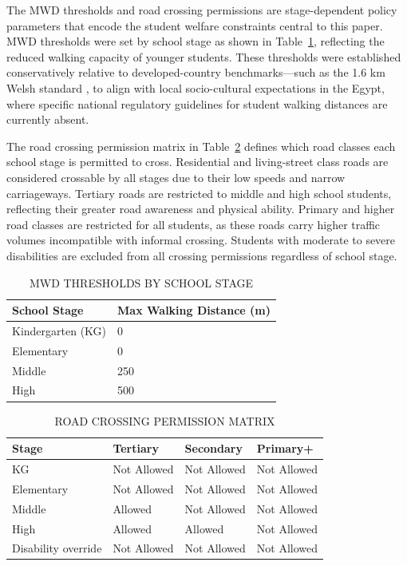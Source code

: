 \documentclass[journal]{IEEEtran}
\begin{document}
The MWD thresholds and road crossing permissions are 
stage-dependent policy parameters that encode the student welfare 
constraints central to this paper. MWD thresholds were set by 
school stage as shown in Table~\ref{tab:mwd_stage}, reflecting 
the reduced walking capacity of younger students. 
These thresholds were established conservatively relative to developed-country benchmarks—such as the 1.6 km Welsh standard \cite{c15}, to align with local socio-cultural expectations in the Egypt, where specific national regulatory guidelines for student walking distances are currently absent.

The road crossing permission matrix in 
Table~\ref{tab:crossing_matrix} defines which road classes each 
school stage is permitted to cross. Residential and living-street 
class roads are considered crossable by all stages due to their 
low speeds and narrow carriageways. Tertiary roads are restricted 
to middle and high school students, reflecting their greater road 
awareness and physical ability. Primary and higher road classes 
are restricted for all students, as these roads carry higher 
traffic volumes incompatible with informal crossing. Students with moderate to severe disabilities
are excluded from all crossing permissions regardless of school 
stage.

\begin{table}[t]
\caption{MWD THRESHOLDS BY SCHOOL STAGE}
\label{tab:mwd_stage}
\centering
\begin{tabular}{p{3.5cm}p{3.5cm}}
\toprule
\textbf{School Stage} & \textbf{Max Walking Distance (m)} \\
\midrule
Kindergarten (KG) & 0 \\
Elementary        & 0 \\
Middle            & 250 \\
High              & 500 \\
\bottomrule
\end{tabular}
\end{table}

\begin{table}[t]
\caption{ROAD CROSSING PERMISSION MATRIX}
\label{tab:crossing_matrix}
\centering
\begin{tabular}{p{1.6cm}p{1.6cm}p{1.6cm}p{1.6cm}}
\toprule
\textbf{Stage} & \textbf{Tertiary} & \textbf{Secondary} & 
\textbf{Primary+} \\
\midrule
KG                  & Not Allowed & Not Allowed & Not Allowed \\
Elementary          & Not Allowed & Not Allowed & Not Allowed \\
Middle              & Allowed     & Not Allowed & Not Allowed \\
High                & Allowed     & Allowed     & Not Allowed \\
Disability override & Not Allowed & Not Allowed & Not Allowed \\
\bottomrule
\end{tabular}
\end{table}
\end{document}
